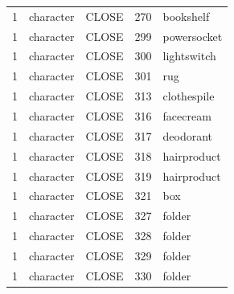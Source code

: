 {\begin{longtable}{lllll}
1 & character & CLOSE & 270 & bookshelf \\
1 & character & CLOSE & 299 & powersocket \\
1 & character & CLOSE & 300 & lightswitch \\
1 & character & CLOSE & 301 & rug \\
1 & character & CLOSE & 313 & clothespile \\
1 & character & CLOSE & 316 & facecream \\
1 & character & CLOSE & 317 & deodorant \\
1 & character & CLOSE & 318 & hairproduct \\
1 & character & CLOSE & 319 & hairproduct \\
1 & character & CLOSE & 321 & box \\
1 & character & CLOSE & 327 & folder \\
1 & character & CLOSE & 328 & folder \\
1 & character & CLOSE & 329 & folder \\
1 & character & CLOSE & 330 & folder \\
\end{longtable}}


